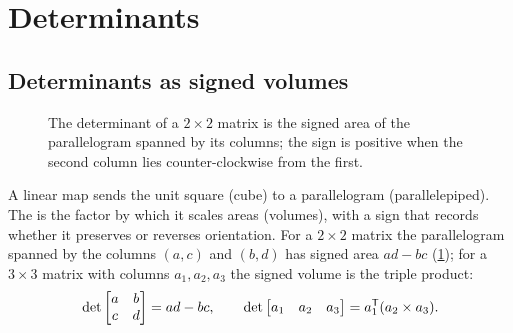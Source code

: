 \section{Determinants}
\label{sec:determinants}

\subsection{Determinants as signed volumes}

\begin{figure}[t]
\centering
{}
\caption{The determinant of a $2\times2$ matrix is the signed area of the parallelogram spanned by its columns; the sign is
positive when the second column lies counter-clockwise from the first.}
\label{fig:det-area}
\end{figure}

A linear map sends the unit square (cube) to a parallelogram (parallelepiped). The  is the factor by
which it scales areas (volumes), with a sign that records whether it preserves or reverses orientation. For a
$2\times2$ matrix the parallelogram spanned by the columns $(a, c)$ and $(b, d)$ has signed area $ad - bc$
(\cref{fig:det-area}); for a $3\times3$ matrix with columns $a_1, a_2, a_3$ the signed volume is the triple product:
\begin{equation}
  \det\begin{bmatrix} a & b \\ c & d \end{bmatrix} = ad - bc, \qquad
  \det\begin{bmatrix} a_1 & a_2 & a_3 \end{bmatrix} = a_1^{\mathsf{T}}(a_2 \times a_3).
\end{equation}

